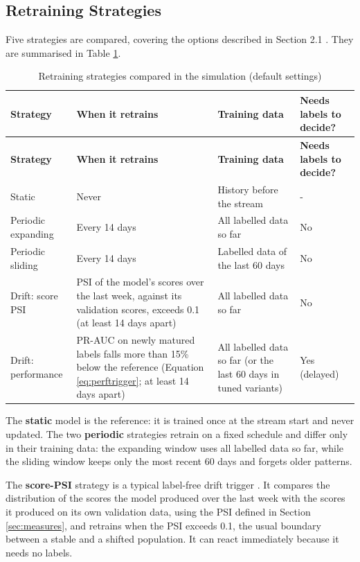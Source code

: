 \subsection{Retraining Strategies}\label{sec:strategies}

Five strategies are compared, covering the options described in Section 2.1 \cite{pulicharla2019,dalpozzolo2018}. They are summarised in Table \ref{tab:strategies}.

{\footnotesize
\begin{longtable}{>{\raggedright\arraybackslash}p{}>{\raggedright\arraybackslash}p{}>{\raggedright\arraybackslash}p{}>{\raggedright\arraybackslash}p{}}
\caption{Retraining strategies compared in the simulation (default settings)}\label{tab:strategies}\\
\toprule
\textbf{Strategy} & \textbf{When it retrains} & \textbf{Training data} & \textbf{Needs labels to decide?} \\
\midrule
\endfirsthead
\toprule
\textbf{Strategy} & \textbf{When it retrains} & \textbf{Training data} & \textbf{Needs labels to decide?} \\
\midrule
\endhead
Static & Never & History before the stream & - \\ \midrule
Periodic expanding & Every 14 days & All labelled data so far & No \\ \midrule
Periodic sliding & Every 14 days & Labelled data of the last 60 days & No \\ \midrule
Drift: score PSI & PSI of the model's scores over the last week, against its validation scores, exceeds 0.1 (at least 14 days apart) & All labelled data so far & No \\ \midrule
Drift: performance & PR-AUC on newly matured labels falls more than 15\% below the reference (Equation \ref{eq:perftrigger}; at least 14 days apart) & All labelled data so far (or the last 60 days in tuned variants) & Yes (delayed) \\ \bottomrule
\end{longtable}
}

The \textbf{static} model is the reference: it is trained once at the stream start and never updated. The two \textbf{periodic} strategies retrain on a fixed schedule and differ only in their training data: the expanding window uses all labelled data so far, while the sliding window keeps only the most recent 60 days and forgets older patterns.

The \textbf{score-PSI} strategy is a typical label-free drift trigger \cite{shakil2025,wong2025}. It compares the distribution of the scores the model produced over the last week with the scores it produced on its own validation data, using the PSI defined in Section \ref{sec:measures}, and retrains when the PSI exceeds 0.1, the usual boundary between a stable and a shifted population. It can react immediately because it needs no labels.

